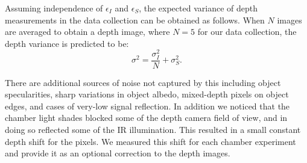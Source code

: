 Assuming independence of $\epsilon_I$ and $\epsilon_S$, the expected variance of depth measurements in the data collection can be obtained as follows. When $N$ images are averaged to obtain a depth image, where $N=5$ for our data collection, the depth variance is predicted to be:
\begin{equation}
\sigma^2 = \frac{\sigma_I^2}{N} + \sigma_S^2.\label{eq:sigma}
\end{equation}

There are additional sources of noise not captured by this including object specularities, sharp variations in object albedo, mixed-depth pixels on object edges, and cases of very-low signal reflection. In addition we noticed that the chamber light shades blocked some of the depth camera field of view, and in doing so reflected some of the IR illumination. This resulted in a small constant depth shift for the pixels. We measured this shift for each chamber experiment and provide it as an optional correction to the depth images.






